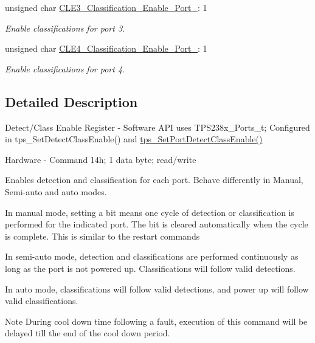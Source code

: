 \begin{DoxyCompactItemize}
unsigned char \hyperlink{struct_t_p_s238x___detect___classification___enable___register__t_a12fc84c5940eb1236125bde36f6c0895}{C\-L\-E3\-\_\-\-Classification\-\_\-\-Enable\-\_\-\-Port\-\_}\-: 1
\begin{DoxyCompactList}\small\item\em Enable classifications for port 3. \end{DoxyCompactList}\item 
unsigned char \hyperlink{struct_t_p_s238x___detect___classification___enable___register__t_ad1efcac7c9fab4012689abadffdce167}{C\-L\-E4\-\_\-\-Classification\-\_\-\-Enable\-\_\-\-Port\-\_}\-: 1
\begin{DoxyCompactList}\small\item\em Enable classifications for port 4. \end{DoxyCompactList}\end{DoxyCompactItemize}


\subsection{Detailed Description}
Detect/\-Class Enable Register -\/ Software A\-P\-I uses T\-P\-S238x\-\_\-\-Ports\-\_\-t; Configured in tps\-\_\-\-Set\-Detect\-Class\-Enable() and \hyperlink{_t_p_s23861_8c_a60e64452aad48caf62d2e2e590471666}{tps\-\_\-\-Set\-Port\-Detect\-Class\-Enable()} \par
 Hardware -\/ Command 14h; 1 data byte; read/write \par
\par
 Enables detection and classification for each port. Behave differently in Manual, Semi-\/auto and auto modes. \par
 In manual mode, setting a bit means one cycle of detection or classification is performed for the indicated port. The bit is cleared automatically when the cycle is complete. This is similar to the restart commands\par
 In semi-\/auto mode, detection and classifications are performed continuously as long as the port is not powered up. Classifications will follow valid detections. \par
 In auto mode, classifications will follow valid detections, and power up will follow valid classifications. \par
 \begin{DoxyNote}{Note}
During cool down time following a fault, execution of this command will be delayed till the end of the cool down period. 
\end{DoxyNote}


